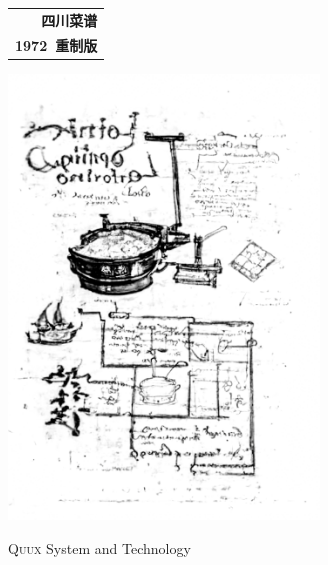 \null%
\vspace{.75\baselineskip}
\begin{center}
\begin{tabular}{r}
	{\Huge\bfseries 四川菜谱}\\
	{\normalsize\bfseries 1972~重制版}%
\end{tabular}

\vfill

\includegraphics[height=118.125mm]{cooking-machine.png}%

\vfill

{\footnotesize \textsc{Quux} System and Technology}
\end{center}
\vspace{.75\baselineskip}

